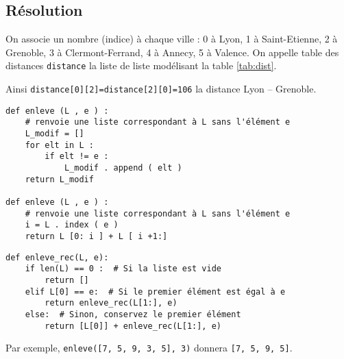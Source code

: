 \subsection*{Résolution}

On associe un nombre (indice) à chaque ville : 0 à Lyon, 1 à Saint-Etienne, 2 à Grenoble, 3 à Clermont-Ferrand, 4 à  Annecy, 5 à Valence.
On appelle table des distances \lstinline{distance} la liste de liste modélisant la table \ref{tab:dist}.

Ainsi \lstinline{distance[0][2]=distance[2][0]=106} la distance Lyon -- Grenoble. 

\ifprof
\begin{corrige}
\begin{lstlisting}
def enleve (L , e ) :
    # renvoie une liste correspondant à L sans l'élément e
    L_modif = []
    for elt in L :
        if elt != e :
            L_modif . append ( elt )
    return L_modif

def enleve (L , e ) :
    # renvoie une liste correspondant à L sans l'élément e
    i = L . index ( e )
    return L [0: i ] + L [ i +1:]
\end{lstlisting}
\end{corrige}
\else
\fi


\ifprof
\begin{corrige}
\begin{lstlisting}
def enleve_rec(L, e):
    if len(L) == 0 :  # Si la liste est vide
        return []
    elif L[0] == e:  # Si le premier élément est égal à e
        return enleve_rec(L[1:], e)
    else:  # Sinon, conservez le premier élément
        return [L[0]] + enleve_rec(L[1:], e)
\end{lstlisting}
\end{corrige}
\else
\fi

\begin{exemple}
Par exemple, \lstinline{enleve([7, 5, 9, 3, 5], 3)} donnera \lstinline{[7, 5, 9, 5]}.
\end{exemple}


